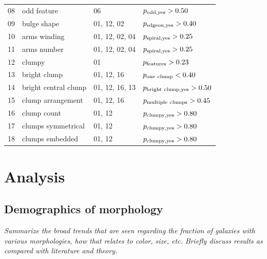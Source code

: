 \documentclass[twocolumn]{aastex6}
\begin{document}
\begin{table}
\begin{tabular}{llll}
08       & odd feature          & 06                    & $p_{\rm odd,yes}> 0.50$            \\
09       & bulge shape          & 01, 12, 02            & $p_{\rm edgeon,yes}>0.40$           \\
10       & arms winding         & 01, 12, 02, 04        & $p_{\rm spiral,yes}>0.25$          \\
11       & arms number          & 01, 12, 02, 04        & $p_{\rm spiral,yes}>0.25$          \\
12       & clumpy               & 01                    & $p_{\rm features}>0.23$            \\
13       & bright clump         & 01, 12, 16            & $p_{\rm one~clump}< 0.40$           \\
14       & bright central clump & 01, 12, 16, 13        & $p_{\rm bright~clump,yes}>0.50$     \\
15       & clump arrangement    & 01, 12, 16            & $p_{\rm multiple~clumps}>0.45$     \\
16       & clump count          & 01, 12                & $p_{\rm clumpy,yes}>0.80$           \\
17       & clumps symmetrical   & 01, 12                & $p_{\rm clumpy,yes}>0.80$           \\
18       & clumps embedded      & 01, 12                & $p_{\rm clumpy,yes}>0.80$           \\
\hline\hline
\end{tabular}
\end{table}

\section{Analysis}\label{sec:analysis}


\subsection{Demographics of morphology}

{\note \it Summarize the broad trends that are seen regarding the fraction of galaxies with various morphologies, how that relates to color, size, etc. Briefly discuss results as compared with literature and theory.}
\end{document}
